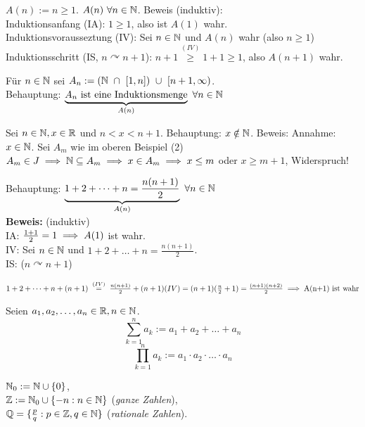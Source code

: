 \documentclass[a4paper,oneside,DIV15,BCOR12mm]{scrbook}
\begin{document}
\begin{beispiele}
\item $A(n) := n \ge 1$. $A(n)\ \forall n \in \mathbb{N}$. Beweis (induktiv):\\
Induktionsanfang (IA): $1 \ge 1$, also ist $A(1)$ wahr. \\
Induktionsvorausseztung (IV): Sei $n \in \mathbb{N}$ und $A(n)$ wahr (also $n \ge 1$) \\
Induktionsschritt (IS, $n \curvearrowright n + 1$): $n+1 
\stackrel{(IV)}{\ge} 1 + 1 \ge 1$, also $A(n+1)$ wahr.
\item Für $n \in \mathbb{N}$ sei $A_n:=(\mathbb{N}\ \cap\ [1,n])\ \cup\ [n+1, \infty)$. \\
Behauptung: $\underbrace{A_n \text{ ist eine Induktionsmenge}}_{A(n)} \ \forall n \in \mathbb{N}$
\item Sei $n \in \mathbb{N}, x \in \mathbb{R}$ und $n<x<n+1$. Behauptung: $x \notin \mathbb{N}$. Beweis: Annahme: $x \in \mathbb{N}$. Sei $A_m$ wie im oberen Beispiel (2) \folgt $A_m \in J \implies \mathbb{N} \subseteq A_m \implies x \in A_m \implies x \le m$ oder $x\ge m+1$, Widerspruch!
\item 
Behauptung: $\underbrace{1+2+\dots +n = \frac{n(n+1)}{2}}_{A(n)}\ \forall n\in \mathbb{N}$\\
\textbf{Beweis:} (induktiv)\\
IA: $\frac{1+1}{2}=1 \implies A(1)$ ist wahr.\\
IV: Sei $n\in \mathbb{N}$ und $1+2+\dots +n = \frac{n(n+1)}{2}$.\\
IS: ($n \curvearrowright  n+1$)

$1+2+\dots +n+(n+1)
 \gleichwegen{(IV)} \frac{n(n+1)}{2} + (n+1) (IV)
 = (n+1)(\frac{n}{2}+1)
 = \frac{(n+1)(n+2)}{2}
\folgt \text{A(n+1) ist wahr}$
\end{beispiele}

\begin{definition}
\begin{liste}
\item Seien $a_1,a_2,\ldots,a_n \in \mathbb{R}, n \in \mathbb{N}$.
$$ \sum_{k=1}^n a_k  := a_1 +     a_2 +     \ldots +     a_n $$
$$ \prod_{k=1}^n a_k := a_1 \cdot a_2 \cdot \ldots \cdot a_n $$

\item $\mathbb{N}_0 := \mathbb{N} \cup \{0\}$,\\
 $\mathbb{Z} := \mathbb{N}_0 \cup \{-n: n\in \mathbb{N}\}$ (\textit{ganze Zahlen}),\\
 $\mathbb{Q} = \{ \frac{p}{q}: p \in \mathbb{Z}, q \in \mathbb{N} \}$ (\textit{rationale Zahlen}).
\end{liste}
\end{definition}
\end{document}
